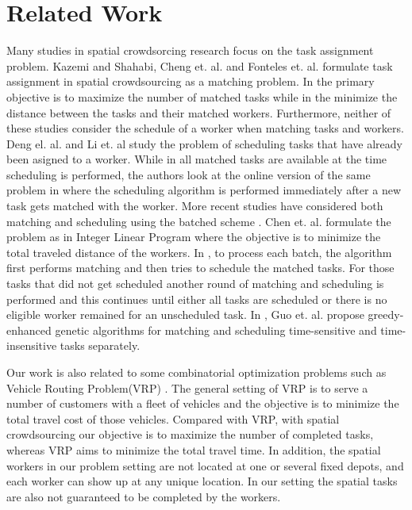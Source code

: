 \vspace{-0.05in}
\section{Related Work}
\label{sec:related}
\vspace{-0.1in}
Many studies in spatial crowdsorcing research focus on the task assignment problem\cite{Kazemi12,Deng13,Li15,Chen15,Deng15,Cheng16,Fonteles15,Guo16}. Kazemi and Shahabi\cite{Kazemi12}, Cheng et. al.\cite{Cheng16} and Fonteles et. al.\cite{Fonteles15} formulate task assignment in spatial crowdsourcing as a matching problem. In \cite{Kazemi12,Fonteles15} the primary objective is to maximize the number of matched tasks while in \cite{Cheng16} the minimize the distance between the tasks and their matched workers. Furthermore, neither of these studies consider the schedule of a worker when matching tasks and workers. Deng el. al.\cite{Deng13} and Li et. al\cite{Li15} study the problem of scheduling tasks that have already been asigned to a worker. While in \cite{Deng13} all matched tasks are available at the time scheduling is performed, the authors look at the online version of the same problem in \cite{Li15} where the scheduling algorithm is performed immediately after a new task gets matched with the worker. More recent studies have considered both matching and scheduling using the batched scheme \cite{Chen15,Deng15,Guo16}. Chen et. al.\cite{Chen15} formulate the problem as in Integer Linear Program where the objective is to minimize the total traveled distance of the workers. In \cite{Deng15}, to process each batch, the algorithm first performs matching and then tries to schedule the matched tasks. For those tasks that did not get scheduled another round of matching and scheduling is performed and this continues until either all tasks are scheduled or there is no eligible worker remained for an unscheduled task. In \cite{Guo16}, Guo et. al. propose greedy-enhanced genetic algorithms for matching and scheduling time-sensitive and time-insensitive tasks separately. 

Our work is also related to some combinatorial optimization problems such as Vehicle Routing Problem(VRP) \cite{Braysy05}. The general setting of VRP is to serve a number of customers with a fleet of vehicles and the objective is to minimize the total travel cost of those vehicles. Compared with VRP, with spatial crowdsourcing our objective is to maximize the number of completed tasks, whereas VRP aims to minimize the total travel time. In addition, the spatial workers in our problem setting are not located at one or several fixed depots, and each worker can show up at any unique location. In our setting the spatial tasks are also not guaranteed to be completed by the workers. 

